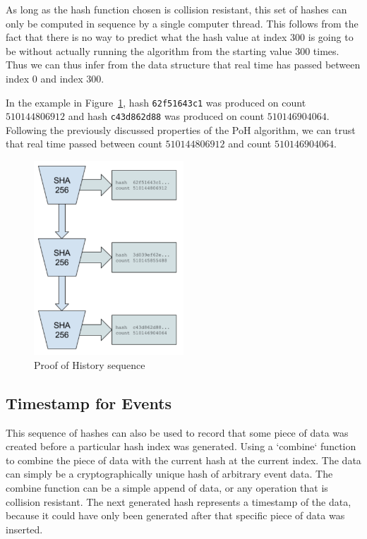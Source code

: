 \documentclass[12pt]{article}
\begin{document}
As long as the hash function chosen is collision resistant, this set of hashes can only be computed in sequence by a single computer thread. This follows from the fact that there is no way to predict what the hash value at index $300$ is going to be without actually running the algorithm from the starting value $300$ times. Thus we can thus infer from the data structure that real time has passed between index $0$ and index $300$.

In the example in Figure~\ref{fig:poh_seq}, hash \texttt{62f51643c1} was produced on
count $510144806912$ and hash \texttt{c43d862d88} was produced on
count $510146904064$. Following the previously discussed properties of the PoH algorithm, we can trust that real time passed between count $510144806912$
and count $510146904064$.

\begin{figure}[h]
  \begin{center}
    \centering
    \includegraphics[width=0.5\textwidth]{figures/poh_sequence_001.png}
    \caption[Figure 2]{Proof of History sequence\label{fig:poh_seq}}
  \end{center}
  \end{figure}

\subsection{Timestamp for Events}

This sequence of hashes can also be used to record that some piece of data was created before a particular hash index was generated. Using a `combine` function to combine the piece of data with the current hash at the current index. The data can simply be a cryptographically unique hash of arbitrary event data. The combine function can be a simple append of data, or any operation that is collision resistant. The next generated hash represents a timestamp of the data, because it could have only been generated after that specific piece of data was inserted.\\
\end{document}
